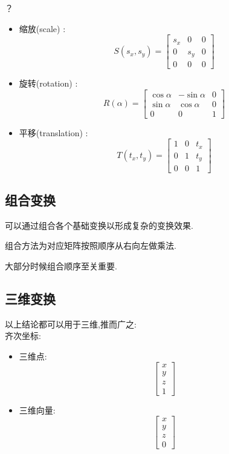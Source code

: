 {{{      {？}
      \begin{itemize}
        \item 缩放(scale) : $$S(s_x, s_y) = \begin{bmatrix}
                  s_x & 0   & 0 \\
                  0   & s_y & 0 \\
                  0   & 0   & 0
                \end{bmatrix}$$
        \item 旋转(rotation) : $$R(\alpha) = \begin{bmatrix}
                  \cos\alpha & -\sin\alpha & 0 \\
                  \sin\alpha & \cos\alpha  & 0 \\
                  0          & 0           & 1
                \end{bmatrix}$$
        \item 平移(translation) : $$T(t_x, t_y) = \begin{bmatrix}
                  1 & 0 & t_x \\
                  0 & 1 & t_y \\
                  0 & 0 & 1
                \end{bmatrix}$$
      \end{itemize}

     }%

    \subsection{组合变换}{
      可以通过组合各个基础变换以形成复杂的变换效果.

      组合方法为对应矩阵按照顺序从右向左做乘法.

      大部分时候组合顺序至关重要.

    }%

    \subsection{三维变换}{
      以上结论都可以用于三维,推而广之:\\

      齐次坐标:\begin{itemize}
        \item 三维点:$$\begin{bmatrix}
                  x \\
                  y \\
                  z \\
                  1
                \end{bmatrix}$$
        \item 三维向量:$$\begin{bmatrix}
                  x \\
                  y \\
                  z \\
                  0
                \end{bmatrix}$$
      \end{itemize}

}}}
